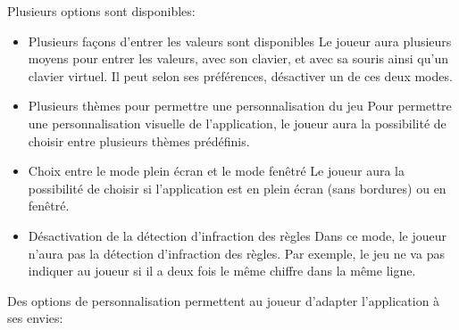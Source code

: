 {
    Plusieurs options sont disponibles:
    \begin{itemize}
    \item {}
            {Plusieurs façons d'entrer les valeurs sont disponibles}
            {
                Le joueur aura plusieurs moyens pour entrer les valeurs, avec son clavier, et avec sa souris ainsi qu'un clavier virtuel.
                Il peut selon ses préférences, désactiver un de ces deux modes.
            }
    \end{itemize}

    \begin{itemize}
        \item {}
        {Plusieurs thèmes pour permettre une personnalisation du jeu}
        {
            Pour permettre une personnalisation visuelle de l'application, le joueur aura la possibilité de choisir entre plusieurs thèmes prédéfinis.
        }
    \end{itemize}

    \begin{itemize}
        \item {}
        {Choix entre le mode plein écran et le mode fenêtré}
        {
            Le joueur aura la possibilité de choisir si l'application est en plein écran (sans bordures) ou en fenêtré.
        }
    \end{itemize}

    \begin{itemize}
        \item {}
        {Désactivation de la détection d'infraction des règles}
        {
            Dans ce mode, le joueur n'aura pas la détection d'infraction des règles. Par exemple, le jeu ne va pas indiquer au joueur si il a deux fois le même chiffre dans la même ligne.
        }
    \end{itemize}
    
}
{
    Des options de personnalisation permettent au joueur d'adapter l'application à ses envies:
}